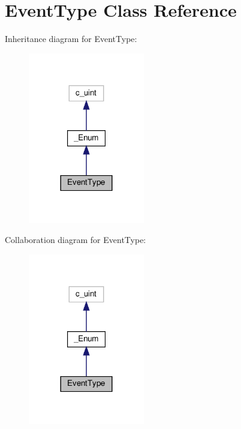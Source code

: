 \hypertarget{classvlc_1_1_event_type}{}\section{Event\+Type Class Reference}
\label{classvlc_1_1_event_type}


Inheritance diagram for Event\+Type\+:
\nopagebreak
\begin{figure}[H]
\begin{center}
\leavevmode
\includegraphics[width=144pt]{classvlc_1_1_event_type__inherit__graph}
\end{center}
\end{figure}


Collaboration diagram for Event\+Type\+:
\nopagebreak
\begin{figure}[H]
\begin{center}
\leavevmode
\includegraphics[width=144pt]{classvlc_1_1_event_type__coll__graph}
\end{center}
\end{figure}
